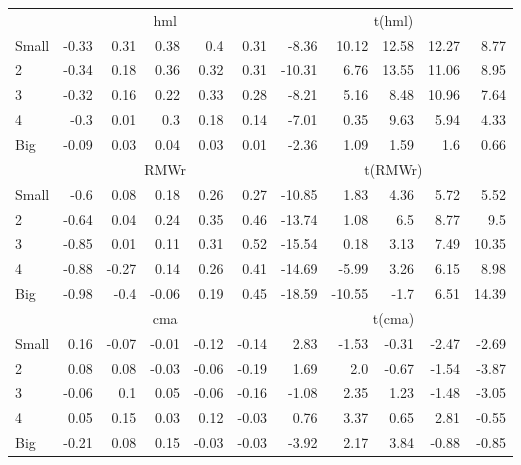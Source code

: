 \begin{table}[!ht]
\begin{tabular}{lrrrrrrrrrr}
  

      & \multicolumn{5}{c}{hml} & \multicolumn{5}{c}{t(hml)} \\
    \cmidrule(r){2-6} \cmidrule(r){7-11}
      Small  & -0.33  & 0.31  & 0.38  & 0.4  & 0.31   & -8.36  & 10.12  & 12.58  & 12.27  & 8.77  \\
          2  & -0.34  & 0.18  & 0.36  & 0.32  & 0.31   & -10.31  & 6.76  & 13.55  & 11.06  & 8.95  \\
          3  & -0.32  & 0.16  & 0.22  & 0.33  & 0.28   & -8.21  & 5.16  & 8.48  & 10.96  & 7.64  \\
          4  & -0.3  & 0.01  & 0.3  & 0.18  & 0.14   & -7.01  & 0.35  & 9.63  & 5.94  & 4.33  \\
      Big    & -0.09  & 0.03  & 0.04  & 0.03  & 0.01   & -2.36  & 1.09  & 1.59  & 1.6  & 0.66  \\

  

      & \multicolumn{5}{c}{RMWr} & \multicolumn{5}{c}{t(RMWr)} \\
    \cmidrule(r){2-6} \cmidrule(r){7-11}
      Small  & -0.6  & 0.08  & 0.18  & 0.26  & 0.27   & -10.85  & 1.83  & 4.36  & 5.72  & 5.52  \\
          2  & -0.64  & 0.04  & 0.24  & 0.35  & 0.46   & -13.74  & 1.08  & 6.5  & 8.77  & 9.5  \\
          3  & -0.85  & 0.01  & 0.11  & 0.31  & 0.52   & -15.54  & 0.18  & 3.13  & 7.49  & 10.35  \\
          4  & -0.88  & -0.27  & 0.14  & 0.26  & 0.41   & -14.69  & -5.99  & 3.26  & 6.15  & 8.98  \\
      Big    & -0.98  & -0.4  & -0.06  & 0.19  & 0.45   & -18.59  & -10.55  & -1.7  & 6.51  & 14.39  \\

  

      & \multicolumn{5}{c}{cma} & \multicolumn{5}{c}{t(cma)} \\
    \cmidrule(r){2-6} \cmidrule(r){7-11}
      Small  & 0.16  & -0.07  & -0.01  & -0.12  & -0.14   & 2.83  & -1.53  & -0.31  & -2.47  & -2.69  \\
          2  & 0.08  & 0.08  & -0.03  & -0.06  & -0.19   & 1.69  & 2.0  & -0.67  & -1.54  & -3.87  \\
          3  & -0.06  & 0.1  & 0.05  & -0.06  & -0.16   & -1.08  & 2.35  & 1.23  & -1.48  & -3.05  \\
          4  & 0.05  & 0.15  & 0.03  & 0.12  & -0.03   & 0.76  & 3.37  & 0.65  & 2.81  & -0.55  \\
      Big    & -0.21  & 0.08  & 0.15  & -0.03  & -0.03   & -3.92  & 2.17  & 3.84  & -0.88  & -0.85  \\

  

  \bottomrule
\end{tabular}
\label{tbl:25_Size_OP_FF2016a}
\end{table}